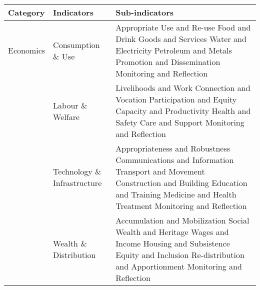 \begin{table}[th]
\begin{center}
\begin{tabular}{ >{\raggedright\arraybackslash}p{} >{\raggedright\arraybackslash}p{} >{\raggedright\arraybackslash}p{} }
\hline
Category & Indicators & Sub-indicators \\
\hline
Economics & Consumption \& Use & Appropriate Use and Re-use \linebreak Food and Drink \linebreak Goods and Services \linebreak Water and Electricity \linebreak Petroleum and Metals \linebreak Promotion and Dissemination \linebreak Monitoring and Reflection \linebreak \\
  & Labour \& Welfare & Livelihoods and Work \linebreak Connection and Vocation \linebreak Participation and Equity \linebreak Capacity and Productivity \linebreak Health and Safety \linebreak Care and Support \linebreak Monitoring and Reflection \linebreak \\
  & Technology \& Infrastructure & Appropriateness and Robustness \linebreak Communications and Information \linebreak Transport and Movement \linebreak Construction and Building \linebreak Education and Training \linebreak Medicine and Health Treatment \linebreak Monitoring and Reflection \linebreak \\
  & Wealth \& Distribution & Accumulation and Mobilization \linebreak Social Wealth and Heritage
Wages and Income \linebreak Housing and Subsistence \linebreak Equity and Inclusion \linebreak Re-distribution and Apportionment \linebreak Monitoring and Reflection \linebreak \\

\end{tabular}
\end{center}
\end{table}
